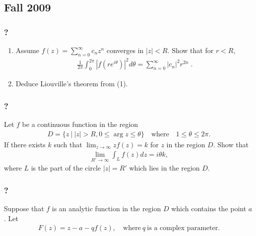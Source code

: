 \hypertarget{fall-2009}{%
\subsection{Fall 2009}\label{fall-2009}}

\hypertarget{section-87}{%
\subsubsection{?}\label{section-87}}

\begin{enumerate}
\def\labelenumi{(\arabic{enumi})}
\item
  Assume \(\displaystyle f(z) = \sum_{n=0}^\infty c_n z^n\) converges in
  \(|z| < R\). Show that for \(r <R\),
  \begin{align*}\frac{1}{2 \pi} \int_0^{2 \pi} |f(r e^{i \theta})|^2 d \theta =
  \sum_{n=0}^\infty |c_n|^2 r^{2n} \; .\end{align*}
\item
  Deduce Liouville's theorem from (1).
\end{enumerate}

\hypertarget{section-88}{%
\subsubsection{?}\label{section-88}}

Let \(f\) be a continuous function in the region
\begin{align*}D=\{z {~\mathrel{\Big|}~}{\left\lvert {z} \right\rvert}>R, 0\leq \arg z\leq \theta\}\quad\text{where}\quad
1\leq \theta \leq 2\pi.\end{align*}
If there exists \(k\) such that
\(\displaystyle{\lim_{z\to\infty} zf(z)=k}\) for \(z\) in the region
\(D\). Show that
\begin{align*}\lim_{R'\to\infty} \int_{L} f(z) dz=i\theta k,\end{align*}
where \(L\) is the part of the circle \(|z|=R'\) which lies in the
region \(D\).

\hypertarget{section-89}{%
\subsubsection{?}\label{section-89}}

Suppose that \(f\) is an analytic function in the region \(D\) which
contains the point \(a\). Let
\begin{align*}F(z)= z-a-qf(z),\quad \text{where}~ q \ \text{is a complex
parameter}.\end{align*}

